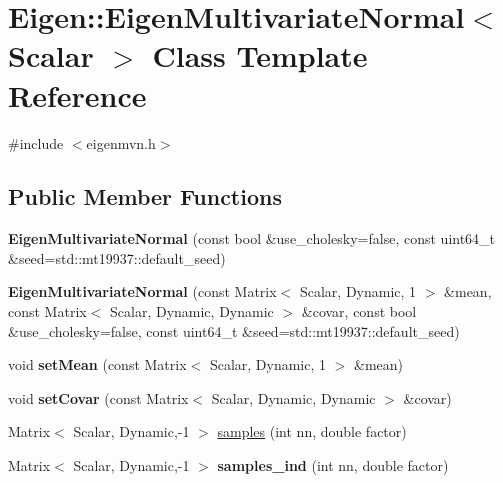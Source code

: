 \hypertarget{classEigen_1_1EigenMultivariateNormal}{\section{Eigen\-:\-:Eigen\-Multivariate\-Normal$<$ Scalar $>$ Class Template Reference}
\label{classEigen_1_1EigenMultivariateNormal}
}


{\ttfamily \#include $<$eigenmvn.\-h$>$}

\subsection*{Public Member Functions}
\begin{DoxyCompactItemize}
\item 
\hypertarget{classEigen_1_1EigenMultivariateNormal_ad8dc1c371b98d343741f144a3babef91}{{\bfseries Eigen\-Multivariate\-Normal} (const bool \&use\-\_\-cholesky=false, const uint64\-\_\-t \&seed=std\-::mt19937\-::default\-\_\-seed)}\label{classEigen_1_1EigenMultivariateNormal_ad8dc1c371b98d343741f144a3babef91}

\item 
\hypertarget{classEigen_1_1EigenMultivariateNormal_a427929ac9e14e93d56ec6acdb85a8dbb}{{\bfseries Eigen\-Multivariate\-Normal} (const Matrix$<$ Scalar, Dynamic, 1 $>$ \&mean, const Matrix$<$ Scalar, Dynamic, Dynamic $>$ \&covar, const bool \&use\-\_\-cholesky=false, const uint64\-\_\-t \&seed=std\-::mt19937\-::default\-\_\-seed)}\label{classEigen_1_1EigenMultivariateNormal_a427929ac9e14e93d56ec6acdb85a8dbb}

\item 
\hypertarget{classEigen_1_1EigenMultivariateNormal_aa9b735112cea507cd0a5f0eeffafe3c2}{void {\bfseries set\-Mean} (const Matrix$<$ Scalar, Dynamic, 1 $>$ \&mean)}\label{classEigen_1_1EigenMultivariateNormal_aa9b735112cea507cd0a5f0eeffafe3c2}

\item 
\hypertarget{classEigen_1_1EigenMultivariateNormal_a56942d3a51cf934f85d5b95275da9d18}{void {\bfseries set\-Covar} (const Matrix$<$ Scalar, Dynamic, Dynamic $>$ \&covar)}\label{classEigen_1_1EigenMultivariateNormal_a56942d3a51cf934f85d5b95275da9d18}

\item 
Matrix$<$ Scalar, Dynamic,-\/1 $>$ \hyperlink{classEigen_1_1EigenMultivariateNormal_a0a0c8f8310e6469b3365e735e95c9c87}{samples} (int nn, double factor)
\item 
\hypertarget{classEigen_1_1EigenMultivariateNormal_a957ca8e363a84616c1cb235d595fbfcd}{Matrix$<$ Scalar, Dynamic,-\/1 $>$ {\bfseries samples\-\_\-ind} (int nn, double factor)}\label{classEigen_1_1EigenMultivariateNormal_a957ca8e363a84616c1cb235d595fbfcd}

\end{DoxyCompactItemize}
